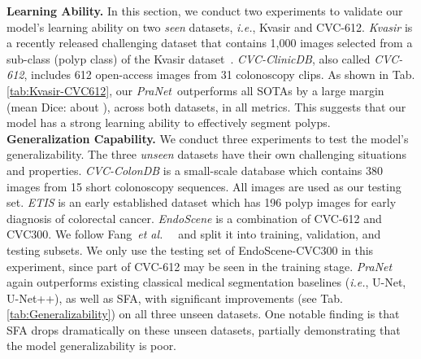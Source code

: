 \documentclass[runningheads]{llncs}
\newcommand{\tabref}[1]{Tab. \ref{#1}}
\def\etal{{\em et al.}}
\def\ie{\emph{i.e.}}
\def\etal{{\em et al.~}}
\def\ourmodel{\textit{PraNet}}
\begin{document}
\noindent\textbf{Learning Ability.} In this section, we conduct two experiments to validate our model's learning ability on two \textit{seen} datasets, \ie, Kvasir and CVC-612.
\textit{Kvasir} is a recently released challenging dataset that contains 1,000 images selected from a sub-class (polyp class) of the Kvasir dataset~\cite{pogorelov2017kvasir}. 
\textit{CVC-ClinicDB}, also called \textit{CVC-612}, includes 612 open-access images from 31 colonoscopy clips.
As shown in \tabref{tab:Kvasir-CVC612}, our \ourmodel~outperforms all SOTAs by a large margin (mean Dice: about ), across both datasets, in all metrics. 
This suggests that our model has a strong learning ability to effectively segment polyps. \\

\noindent\textbf{Generalization Capability.} We conduct three experiments to test the model's generalizability. The three \textit{unseen} datasets have their own challenging situations and properties. \textit{CVC-ColonDB} is a small-scale database which contains 380 images from 15 short colonoscopy sequences. All images are used as our testing set.
\textit{ETIS} is an early established dataset which has 196 polyp images for early diagnosis of colorectal cancer.
\textit{EndoScene} is a combination of CVC-612 and CVC300. We follow Fang~\etal~\cite{fang2019selective} and split it into training, validation, and testing subsets. We only use the testing set of EndoScene-CVC300 in this experiment, since part of CVC-612 may be seen in the training stage. 
\ourmodel~ again outperforms existing classical medical segmentation baselines (\ie, U-Net, U-Net++), as well as SFA, with significant improvements (see \tabref{tab:Generalizability})
on all three unseen datasets. One notable finding is that SFA drops dramatically on these unseen datasets, partially demonstrating that the model generalizability is poor. \\
\end{document}
